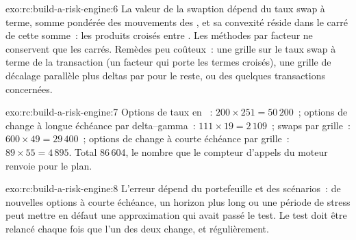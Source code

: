 \begin{solution}{exo:rc:build-a-risk-engine:6}
La valeur de la swaption dépend du taux swap à terme, somme pondérée des mouvements des , et sa convexité réside dans
le carré de cette somme~: les produits croisés entre . Les méthodes par facteur ne conservent que les carrés.
Remèdes peu coûteux~: une grille sur le taux swap à terme de la transaction (un facteur qui porte les termes croisés), une
grille de décalage parallèle plus deltas par  pour le reste, ou  des quelques transactions concernées.
\end{solution}

\begin{solution}{exo:rc:build-a-risk-engine:7}
Options de taux en ~: $200\times251 = 50\,200$~; options de change à longue échéance par delta--gamma~: $111\times19 = 2\,109$~; swaps
par grille~: $600\times49 = 29\,400$~; options de change à courte échéance par grille~: $89\times55 = 4\,895$. Total 86\,604, le nombre que le
compteur d'appels du moteur renvoie pour le plan.
\end{solution}

\begin{solution}{exo:rc:build-a-risk-engine:8}
L'erreur dépend du portefeuille et des scénarios~: de nouvelles options à courte échéance, un horizon plus long ou une période de stress
peut mettre en défaut une approximation qui avait passé le test. Le test doit être relancé chaque fois que l'un des deux change, et
régulièrement.
\end{solution}

